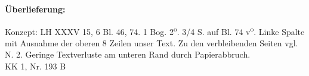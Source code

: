    
        
        \begin{ledgroupsized}[r]{120mm}
        \footnotesize 
        \pstart        
        \noindent\textbf{\"{U}berlieferung:}  
        \pend
        \end{ledgroupsized}
      
       
              \begin{ledgroupsized}[r]{114mm}
              \footnotesize 
              \pstart \parindent -6mm
              Konzept: LH XXXV 15, 6 Bl. 46, 74. 1 Bog. 2\textsuperscript{o}. 3/4 S. auf Bl. 74 v\textsuperscript{o}. Linke Spalte mit Ausnahme der oberen 8 Zeilen unser Text. Zu den verbleibenden Seiten vgl. N. 2\protect{}. Geringe Textverluste am unteren Rand durch Papierabbruch.\\KK 1, Nr. 193 B \pend
              \end{ledgroupsized}
        \vspace*{8mm}
        \pstart
        \normalsize
